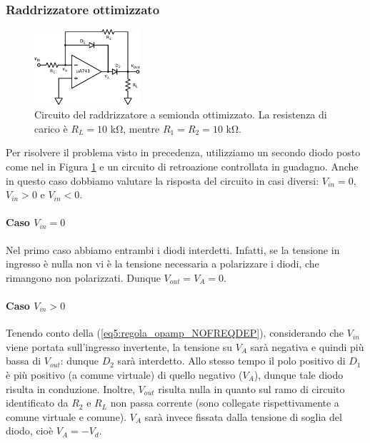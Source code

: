 \newpage
\subsubsection{Raddrizzatore ottimizzato}

\begin{figure}
  \begin{center}
    \includegraphics[width=0.350\textwidth]{../E05/latex/c_rectifier_B.pdf}
  \end{center}
  \caption{Circuito del raddrizzatore a semionda ottimizzato. La resistenza di carico è $R_L=10$ \si{\kilo\ohm}, mentre $R_1=R_2=10$ \si{\kilo\ohm}.}
  \label{cir5:raddrizz_2}
\end{figure}

Per risolvere il problema visto in precedenza, utilizziamo un secondo diodo posto come nel in Figura \ref{cir5:raddrizz_2} e un circuito di retroazione controllata in guadagno. Anche in questo caso dobbiamo valutare la risposta del circuito in casi diversi: $V_{in}=0$, $V_{in}>0$ e $V_{in}<0$.

\paragraph*{Caso $V_{in}=0$}

Nel primo caso abbiamo entrambi i diodi interdetti. Infatti, se la tensione in ingresso è nulla non vi è la tensione necessaria a polarizzare i diodi, che rimangono non polarizzati. Dunque $V_{out}=V_{A}=0$.

\paragraph*{Caso $V_{in}>0$}

Tenendo conto della (\ref{eq5:regola_opamp_NOFREQDEP}), considerando che $V_{in}$ viene portata sull'ingresso invertente, la tensione su $V_{A}$ sarà negativa e quindi più bassa di $V_{out}$: dunque $D_2$ sarà interdetto. Allo stesso tempo il polo positivo di $D_1$ è più positivo (a comune virtuale) di quello negativo ($V_{A}$), dunque tale diodo risulta in conduzione. Inoltre, $V_{out}$ risulta nulla in quanto sul ramo di circuito identificato da $R_2$ e $R_L$ non passa corrente (sono collegate rispettivamente a comune virtuale e comune). $V_{A}$ sarà invece fissata dalla tensione di soglia del diodo, cioè $V_{A}=-V_d$.

